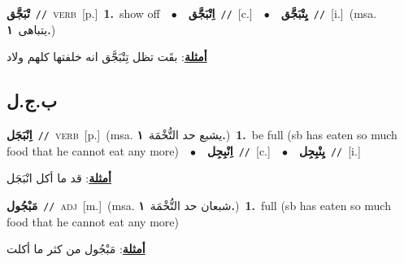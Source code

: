 \documentclass[10pt,a4paper,twoside]{article} %
\begin{document}
\begin{multicols}{2}
{\setlength\topsep{0pt}\textbf{\foreignlanguage{arabic}{تْبَجَّق}}\ {\color{gray}\texttt{//}\color{black}}\ \textsc{verb}\ [p.]\ \textbf{1.}~show off\ \ $\bullet$\ \ \setlength\topsep{0pt}\textbf{\foreignlanguage{arabic}{اِتْبَجَّق}}\ {\color{gray}\texttt{//}\color{black}}\ [c.]\ \ $\bullet$\ \ \setlength\topsep{0pt}\textbf{\foreignlanguage{arabic}{يِتْبَجَّق}}\ {\color{gray}\texttt{//}\color{black}}\ [i.]\ \color{gray}(msa. \foreignlanguage{arabic}{يتباهى}~\foreignlanguage{arabic}{\textbf{١.}})\color{black}\  \begin{flushright}\color{gray}\foreignlanguage{arabic}{\textbf{\underline{\foreignlanguage{arabic}{أمثلة}}}: بقَت تظل تِتْبَجَّق انه خلفتها كلهم ولاد}\end{flushright}\color{black}} \vspace{2mm}

\vspace{-3mm}
\subsection*{\color{blue}\foreignlanguage{arabic}{ب.ج.ل}\color{blue}{}} 

{\setlength\topsep{0pt}\textbf{\foreignlanguage{arabic}{اِنْبَجَل}}\ {\color{gray}\texttt{//}\color{black}}\ \textsc{verb}\ [p.]\ \color{gray}(msa. \foreignlanguage{arabic}{يشبع حد التُّخْمَة}~\foreignlanguage{arabic}{\textbf{١.}})\color{black}\ \textbf{1.}~be full (sb has eaten so much food that he cannot eat any more)\ \ $\bullet$\ \ \setlength\topsep{0pt}\textbf{\foreignlanguage{arabic}{اِنْبِجِل}}\ {\color{gray}\texttt{//}\color{black}}\ [c.]\ \ $\bullet$\ \ \setlength\topsep{0pt}\textbf{\foreignlanguage{arabic}{يِنْبِجِل}}\ {\color{gray}\texttt{//}\color{black}}\ [i.]\  \begin{flushright}\color{gray}\foreignlanguage{arabic}{\textbf{\underline{\foreignlanguage{arabic}{أمثلة}}}: قد ما أكل انْبَجَل}\end{flushright}\color{black}} \vspace{2mm}

{\setlength\topsep{0pt}\textbf{\foreignlanguage{arabic}{مَبْجُول}}\ {\color{gray}\texttt{//}\color{black}}\ \textsc{adj}\ [m.]\ \color{gray}(msa. \foreignlanguage{arabic}{شبعان حد التُّخْمَة}~\foreignlanguage{arabic}{\textbf{١.}})\color{black}\ \textbf{1.}~full (sb has eaten so much food that he cannot eat any more)\  \begin{flushright}\color{gray}\foreignlanguage{arabic}{\textbf{\underline{\foreignlanguage{arabic}{أمثلة}}}: مَبْجُول من كثر ما أكلت}\end{flushright}\color{black}} \vspace{2mm}


\end{multicols}
\end{document}
